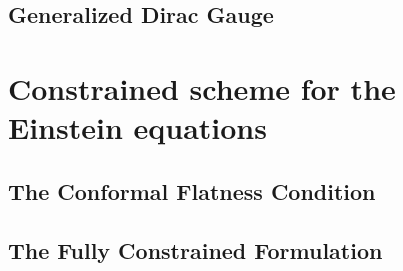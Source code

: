 \subsection{Generalized Dirac Gauge}
\label{section2.4.2}

\section{Constrained scheme for the Einstein equations}  %
\label{section2.5}

\subsection{The Conformal Flatness Condition}  %
\label{section2.5.1}

\subsection{The Fully Constrained Formulation}  %
\label{section2.5.2}

